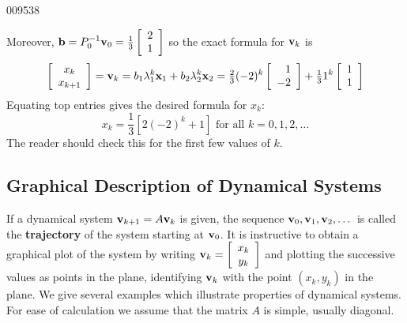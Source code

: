 \begin{example}{}{009538}
\begin{solution}
Moreover, $ \textbf{b} = P_0^{-1} \textbf{v}_0 = \tfrac{1}{3} \left[ \begin{array}{c}
2 \\
1
\end{array}\right]$
 so the exact formula for $\textbf{v}_{k}$ is
\begin{equation*}
\left[ \begin{array}{c}
x_k \\
x_{k+1} 
\end{array} \right] = \textbf{v}_k = b_1 \lambda_1^k \textbf{x}_1 + b_2 \lambda_2^k \textbf{x}_2 = \tfrac{2}{3} (-2)^k \left[ \begin{array}{r}
1 \\
-2
\end{array} \right] + \tfrac{1}{3} 1^k \left[ \begin{array}{r}
1 \\
1
\end{array}\right]
\end{equation*}
Equating top entries gives the desired formula for $x_{k}$:
\begin{equation*}
 x_k = \frac{1}{3} \left[ 2(-2)^k +1 \right] \mbox{ for all } k = 0, 1, 2, \dots
\end{equation*}
The reader should check this for the first few values of $k$.
\end{solution}
\end{example}


\subsection*{Graphical Description of Dynamical Systems}

If a dynamical system $\textbf{v}_{k+1} = A\textbf{v}_{k}$ is given, the sequence $\textbf{v}_{0}, \textbf{v}_{1}, \textbf{v}_{2}, \dots$  is called the \textbf{trajectory} of the system starting at $\textbf{v}_{0}$. It is instructive to obtain a graphical plot of the system by writing $\textbf{v}_k = \left[ \begin{array}{c}
x_k \\
y_k 
\end{array} \right]$
 and plotting the successive values as points in the plane, identifying $\textbf{v}_{k}$ with the point $(x_{k}, y_{k})$
 in the plane. We give several examples which illustrate properties of 
dynamical systems. For ease of calculation we assume that the matrix $A$ is simple, usually diagonal.


